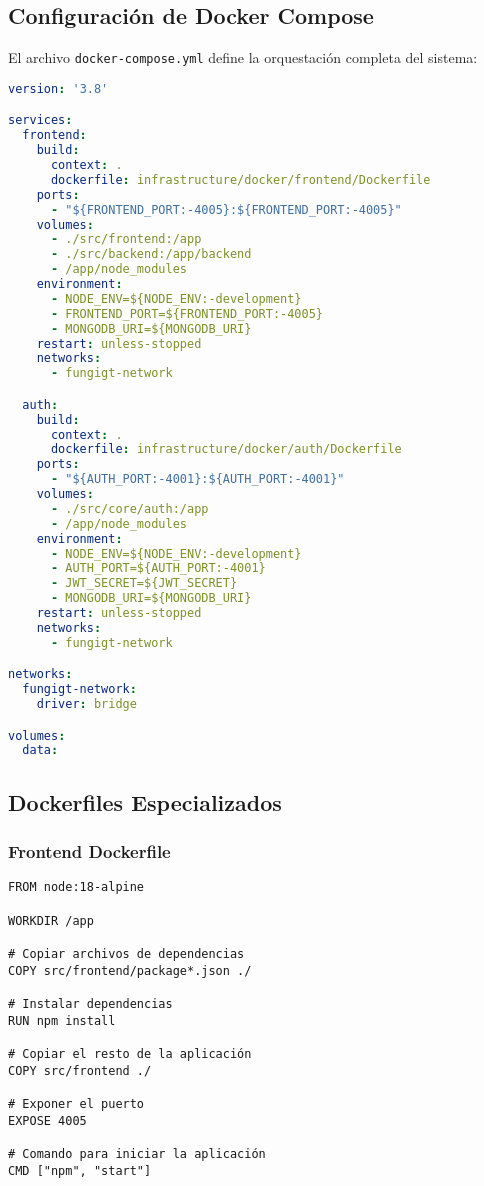 \documentclass[12pt,a4paper]{article}
\begin{document}
\subsection{Configuración de Docker Compose}

El archivo \texttt{docker-compose.yml} define la orquestación completa del sistema:

\begin{lstlisting}[language=yaml, caption=Configuración principal de Docker Compose]
version: '3.8'

services:
  frontend:
    build:
      context: .
      dockerfile: infrastructure/docker/frontend/Dockerfile
    ports:
      - "${FRONTEND_PORT:-4005}:${FRONTEND_PORT:-4005}"
    volumes:
      - ./src/frontend:/app
      - ./src/backend:/app/backend
      - /app/node_modules
    environment:
      - NODE_ENV=${NODE_ENV:-development}
      - FRONTEND_PORT=${FRONTEND_PORT:-4005}
      - MONGODB_URI=${MONGODB_URI}
    restart: unless-stopped
    networks:
      - fungigt-network

  auth:
    build:
      context: .
      dockerfile: infrastructure/docker/auth/Dockerfile
    ports:
      - "${AUTH_PORT:-4001}:${AUTH_PORT:-4001}"
    volumes:
      - ./src/core/auth:/app
      - /app/node_modules
    environment:
      - NODE_ENV=${NODE_ENV:-development}
      - AUTH_PORT=${AUTH_PORT:-4001}
      - JWT_SECRET=${JWT_SECRET}
      - MONGODB_URI=${MONGODB_URI}
    restart: unless-stopped
    networks:
      - fungigt-network

networks:
  fungigt-network:
    driver: bridge

volumes:
  data:
\end{lstlisting}

\subsection{Dockerfiles Especializados}

\subsubsection{Frontend Dockerfile}

\begin{lstlisting}[language=docker, caption=Dockerfile para el servicio Frontend]
FROM node:18-alpine

WORKDIR /app

# Copiar archivos de dependencias
COPY src/frontend/package*.json ./

# Instalar dependencias
RUN npm install

# Copiar el resto de la aplicación
COPY src/frontend ./

# Exponer el puerto
EXPOSE 4005

# Comando para iniciar la aplicación
CMD ["npm", "start"]
\end{lstlisting}
\end{document}
